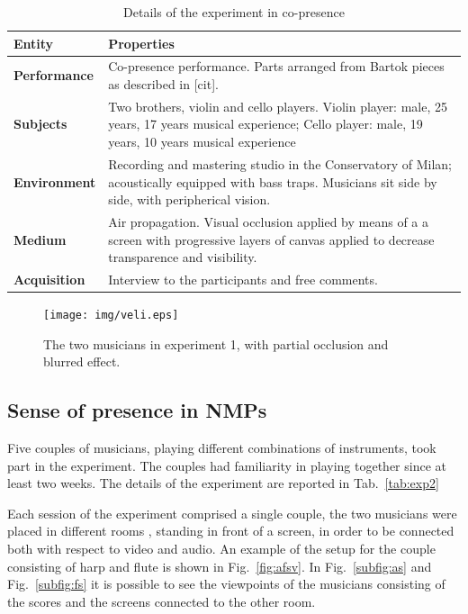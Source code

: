 \begin{table}
\centering
\caption{Details of the experiment in co-presence}
\begin{tabular}{p{1.5cm}p{6cm}}
\hline
\textbf{Entity} & \textbf{Properties} \\
\hline
\textbf{Performance} & Co-presence performance. \newline Parts arranged from Bartok pieces as described in [cit]. \\
\textbf{Subjects} & Two brothers, violin and cello players. \newline Violin player: male, 25 years, 17 years musical experience; 	\newline Cello player: male, 19 years, 10 years  musical experience \\
\textbf{Environment} & Recording and mastering studio in the Conservatory of Milan; acoustically equipped with bass traps. \newline Musicians sit side by side, with peripherical vision.\\
\textbf{Medium} & Air propagation. \newline Visual occlusion applied by means of a a screen with progressive layers of canvas applied to decrease transparence and visibility. \\
\textbf{Acquisition} & Interview to the participants and free comments.\\
\hline
\end{tabular}
\label{tab:exp1}
\end{table}


\begin{figure}[t]
	\centering
	\texttt{[image: img/veli.eps]}
	\caption{The two musicians in experiment 1, with partial occlusion and blurred effect.}
	\label{fig:veli}
\end{figure}


\subsection{Sense of presence in NMPs}
Five couples of musicians, playing different combinations of instruments, took part in the experiment. The couples had familiarity in playing together since at least two weeks. The details of the experiment are reported in Tab.~\ref{tab:exp2}

Each session of the experiment comprised a single couple, the two musicians were placed in different rooms , standing in front of a screen, in order to be connected both with respect to video and audio. An example of the setup for the couple consisting of harp and flute is shown in Fig.~\ref{fig:afsv}. In Fig.~\ref{subfig:as} and Fig.~\ref{subfig:fs} it is possible to see the viewpoints of the musicians consisting of the scores and the screens connected to the other room.

